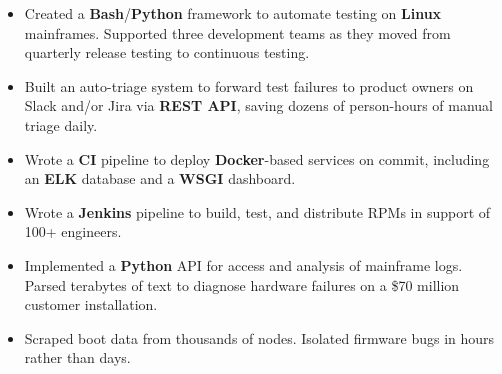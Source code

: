 \documentclass[12pt,letterpaper]{article}
\newenvironment
    {myitemize}
    {\vspace{-4pt}\begin{itemize}[itemsep=3pt, parsep=0pt, topsep=0em]}
    {\end{itemize}}
\begin{document}
\begin{myitemize}
    \item Created a \textbf{Bash}/\textbf{Python} framework to automate testing on \textbf{Linux} mainframes. Supported three development teams as they moved from quarterly release testing to continuous testing.
    \item Built an auto-triage system to forward test failures to product owners on Slack and/or Jira via \textbf{REST API}, saving dozens of person-hours of manual triage daily.
    \item Wrote a \textbf{CI} pipeline to deploy \textbf{Docker}-based services on commit, including an \textbf{ELK} database and a \textbf{WSGI} dashboard.





    \item Wrote a \textbf{Jenkins} pipeline to build, test, and distribute RPMs in support of 100+ engineers.




    \item Implemented a \textbf{Python} API for access and analysis of mainframe logs. Parsed terabytes of text to diagnose hardware failures on a \$70 million customer installation.
    \item Scraped boot data from thousands of nodes. Isolated firmware bugs in hours rather than days.





\end{myitemize}
\end{document}
